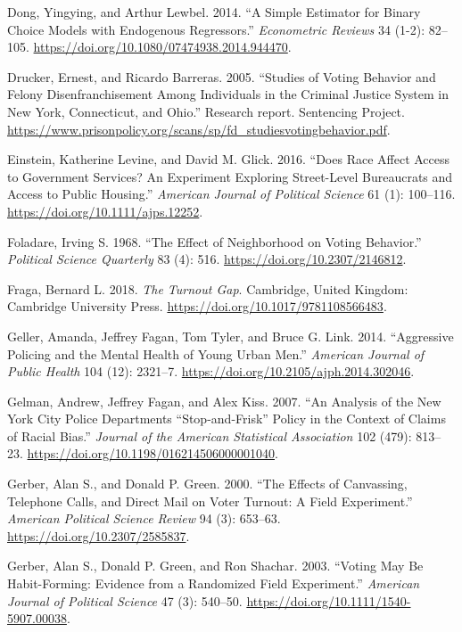 \documentclass[
  12pt,
]{article}
\newlength{\cslhangindent}
\newenvironment{cslreferences}%
  {\setlength{\parindent}{0pt}%
  \everypar{\setlength{\hangindent}{\cslhangindent}}\ignorespaces}%
  {\par}
\begin{document}
\begin{cslreferences}
\leavevmode\hypertarget{ref-Dong2014}{}%
Dong, Yingying, and Arthur Lewbel. 2014. ``A Simple Estimator for Binary Choice Models with Endogenous Regressors.'' \emph{Econometric Reviews} 34 (1-2): 82--105. \url{https://doi.org/10.1080/07474938.2014.944470}.

\leavevmode\hypertarget{ref-Drucker2005}{}%
Drucker, Ernest, and Ricardo Barreras. 2005. ``Studies of Voting Behavior and Felony Disenfranchisement Among Individuals in the Criminal Justice System in New York, Connecticut, and Ohio.'' Research report. Sentencing Project. \url{https://www.prisonpolicy.org/scans/sp/fd_studiesvotingbehavior.pdf}.

\leavevmode\hypertarget{ref-Einstein2016}{}%
Einstein, Katherine Levine, and David M. Glick. 2016. ``Does Race Affect Access to Government Services? An Experiment Exploring Street-Level Bureaucrats and Access to Public Housing.'' \emph{American Journal of Political Science} 61 (1): 100--116. \url{https://doi.org/10.1111/ajps.12252}.

\leavevmode\hypertarget{ref-Foladare1968}{}%
Foladare, Irving S. 1968. ``The Effect of Neighborhood on Voting Behavior.'' \emph{Political Science Quarterly} 83 (4): 516. \url{https://doi.org/10.2307/2146812}.

\leavevmode\hypertarget{ref-Fraga2018}{}%
Fraga, Bernard L. 2018. \emph{The Turnout Gap}. Cambridge, United Kingdom: Cambridge University Press. \url{https://doi.org/10.1017/9781108566483}.

\leavevmode\hypertarget{ref-Geller2014}{}%
Geller, Amanda, Jeffrey Fagan, Tom Tyler, and Bruce G. Link. 2014. ``Aggressive Policing and the Mental Health of Young Urban Men.'' \emph{American Journal of Public Health} 104 (12): 2321--7. \url{https://doi.org/10.2105/ajph.2014.302046}.

\leavevmode\hypertarget{ref-Gelman2007}{}%
Gelman, Andrew, Jeffrey Fagan, and Alex Kiss. 2007. ``An Analysis of the New York City Police Departments ``Stop-and-Frisk'' Policy in the Context of Claims of Racial Bias.'' \emph{Journal of the American Statistical Association} 102 (479): 813--23. \url{https://doi.org/10.1198/016214506000001040}.

\leavevmode\hypertarget{ref-Gerber2000}{}%
Gerber, Alan S., and Donald P. Green. 2000. ``The Effects of Canvassing, Telephone Calls, and Direct Mail on Voter Turnout: A Field Experiment.'' \emph{American Political Science Review} 94 (3): 653--63. \url{https://doi.org/10.2307/2585837}.

\leavevmode\hypertarget{ref-Gerber2003}{}%
Gerber, Alan S., Donald P. Green, and Ron Shachar. 2003. ``Voting May Be Habit-Forming: Evidence from a Randomized Field Experiment.'' \emph{American Journal of Political Science} 47 (3): 540--50. \url{https://doi.org/10.1111/1540-5907.00038}.


\end{cslreferences}
\end{document}
